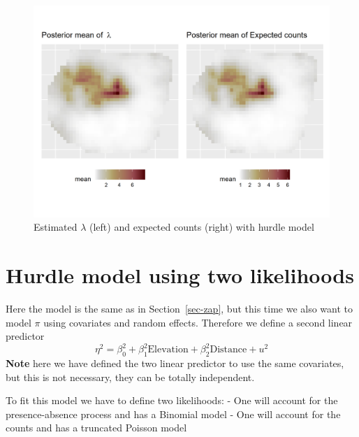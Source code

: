 \documentclass[
  letterpaper,
  DIV=11,
  numbers=noendperiod]{scrartcl}
\begin{document}
\begin{figure}[H]

{\centering \includegraphics[width=0.8\linewidth,height=\textheight,keepaspectratio]{day5_practical_8_files/figure-pdf/unnamed-chunk-76-1.png}

}

\caption{Estimated \(\lambda\) (left) and expected counts (right) with
hurdle model}

\end{figure}%

\section{Hurdle model using two likelihoods}\label{sec-two-lik}

Here the model is the same as in Section~\ref{sec-zap}, but this time we
also want to model \(\pi\) using covariates and random effects.
Therefore we define a second linear predictor \[
\eta^2 =\beta_0^2 + \beta_1^2\text{Elevation} +  \beta_2^2\text{Distance} + u^2 
\] \textbf{Note} here we have defined the two linear predictor to use
the same covariates, but this is not necessary, they can be totally
independent.

To fit this model we have to define two likelihoods: - One will account
for the presence-absence process and has a Binomial model - One will
account for the counts and has a truncated Poisson model
\end{document}
